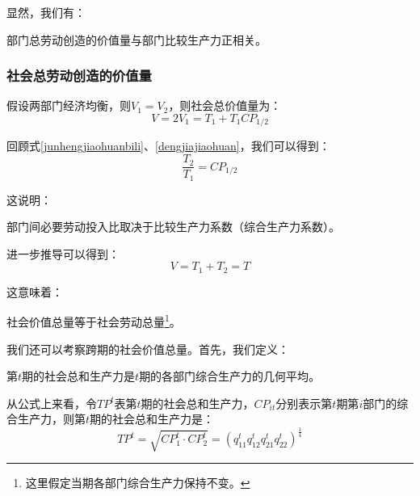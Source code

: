 显然，我们有：
\begin{theorem}
    部门总劳动创造的价值量与部门比较生产力正相关\cite[100]{CaiJiMingCongXiaYiJieZhiLunDaoGuangYiJieZhiLunXiuDingBan2022}。
\end{theorem}

\subsubsection{社会总劳动创造的价值量}

假设两部门经济均衡，则$ V_1 = V_2 $，则社会总价值量为：
\begin{equation}
    V = 2V_1 = T_1 + T_1 \mathit{CP}_{1/2}
\end{equation}

回顾式\ref{junhengjiaohuanbili}、\ref{dengjiajiaohuan}，我们可以得到\cite[290]{CaiJiMingCongGuDianZhengZhiJingJiXueDaoZhongGuoTeSeSheHuiZhuYiZhengZhiJingJiXueJiYuZhongGuoShiJiaoDeZhengZhiJingJiXueYanBianShangCe2023}：
\begin{equation}
    \frac{T_2}{T_1} = \mathit{CP}_{1/2}
\end{equation}

这说明：

\begin{theorem}
    部门间必要劳动投入比取决于比较生产力系数（综合生产力系数）。
\end{theorem}

进一步推导可以得到：
\begin{equation}
    V = T_1 + T_2 = T
\end{equation}

这意味着：
\begin{theorem}
    社会价值总量等于社会劳动总量\cite[75]{CaiJiMingCongXiaYiJieZhiLunDaoGuangYiJieZhiLunXiuDingBan2022}\footnote{这里假定当期各部门综合生产力保持不变。}。
\end{theorem}

我们还可以考察跨期的社会价值总量。首先，我们定义：
\begin{definition}
    第$t$期的社会总和生产力是$t$期的各部门综合生产力的几何平均\cite[291]{CaiJiMingCongGuDianZhengZhiJingJiXueDaoZhongGuoTeSeSheHuiZhuYiZhengZhiJingJiXueJiYuZhongGuoShiJiaoDeZhengZhiJingJiXueYanBianShangCe2023}。
\end{definition}

从公式上来看，令$\mathit{TP}^t$表第$t$期的社会总和生产力，$CP_{it}$分别表示第$t$期第$i$部门的综合生产力，则第$t$期的社会总和生产力是\cite[291]{CaiJiMingCongGuDianZhengZhiJingJiXueDaoZhongGuoTeSeSheHuiZhuYiZhengZhiJingJiXueJiYuZhongGuoShiJiaoDeZhengZhiJingJiXueYanBianShangCe2023}：
\begin{equation}
    \mathit{TP}^t = \sqrt{\mathit{CP}_1^t \cdot \mathit{CP}_2^t} = \left( q_{11}^t q_{12}^t q_{21}^t q_{22}^t \right)^\frac{1}{4}
\end{equation}

